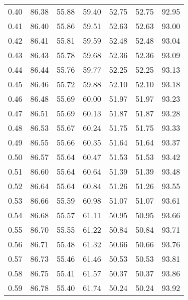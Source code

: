 \begin{tabular}{|c|c|c|c|c|c|c|}
      0.40 &     86.38 &     55.88 &      59.40 &   52.75 &      52.75 &         92.95 \\
      0.41 &     86.40 &     55.86 &      59.51 &   52.63 &      52.63 &         93.00 \\
      0.42 &     86.41 &     55.81 &      59.59 &   52.48 &      52.48 &         93.04 \\
      0.43 &     86.43 &     55.78 &      59.68 &   52.36 &      52.36 &         93.09 \\
      0.44 &     86.44 &     55.76 &      59.77 &   52.25 &      52.25 &         93.13 \\
      0.45 &     86.46 &     55.72 &      59.88 &   52.10 &      52.10 &         93.18 \\
      0.46 &     86.48 &     55.69 &      60.00 &   51.97 &      51.97 &         93.23 \\
      0.47 &     86.51 &     55.69 &      60.13 &   51.87 &      51.87 &         93.28 \\
      0.48 &     86.53 &     55.67 &      60.24 &   51.75 &      51.75 &         93.33 \\
      0.49 &     86.55 &     55.66 &      60.35 &   51.64 &      51.64 &         93.37 \\
      0.50 &     86.57 &     55.64 &      60.47 &   51.53 &      51.53 &         93.42 \\
      0.51 &     86.60 &     55.64 &      60.64 &   51.39 &      51.39 &         93.48 \\
      0.52 &     86.64 &     55.64 &      60.84 &   51.26 &      51.26 &         93.55 \\
      0.53 &     86.66 &     55.59 &      60.98 &   51.07 &      51.07 &         93.61 \\
      0.54 &     86.68 &     55.57 &      61.11 &   50.95 &      50.95 &         93.66 \\
      0.55 &     86.70 &     55.55 &      61.22 &   50.84 &      50.84 &         93.71 \\
      0.56 &     86.71 &     55.48 &      61.32 &   50.66 &      50.66 &         93.76 \\
      0.57 &     86.73 &     55.46 &      61.46 &   50.53 &      50.53 &         93.81 \\
      0.58 &     86.75 &     55.41 &      61.57 &   50.37 &      50.37 &         93.86 \\
      0.59 &     86.78 &     55.40 &      61.74 &   50.24 &      50.24 &         93.92 \\

\end{tabular}
